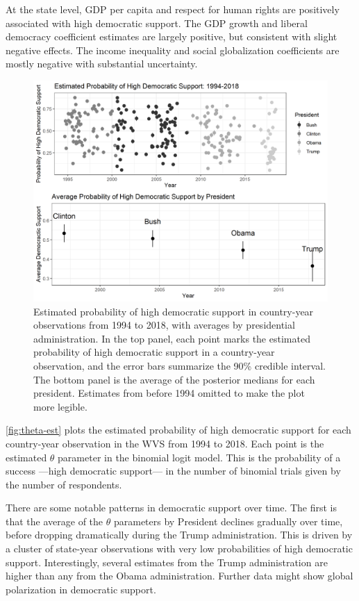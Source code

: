 \documentclass[12pt]{article}
\begin{document}
At the state level, GDP per capita and respect for human rights are positively associated with high democratic support. 
The GDP growth and liberal democracy coefficient estimates are largely positive, but consistent with slight negative effects. 
The income inequality and social globalization coefficients are mostly negative with substantial uncertainty. 


\begin{figure}
\includegraphics[width = .95\textwidth]{theta-est.png}
\caption{Estimated probability of high democratic support in country-year observations from 1994 to 2018, with averages by presidential administration. In the top panel, each point marks the estimated probability of high democratic support in a country-year observation, and the error bars summarize the 90\% credible interval. The bottom panel is the average of the posterior medians for each president. Estimates from before 1994 omitted to make the plot more legible.  }
\label{fig:theta-est} 
\end{figure}


\autoref{fig:theta-est} plots the estimated probability of high democratic support for each country-year observation in the WVS from 1994 to 2018. 
Each point is the estimated $\theta$ parameter in the binomial logit model.
This is the probability of a success ---high democratic support--- in the number of binomial trials given by the number of respondents. 


There are some notable patterns in democratic support over time.
The first is that the average of the $\theta$ parameters by President declines gradually over time, before dropping dramatically during the Trump administration.  
This is driven by a cluster of state-year observations with very low probabilities of high democratic support. 
Interestingly, several estimates from the Trump administration are higher than any from the Obama administration. 
Further data might show global polarization in democratic support. 
\end{document}
